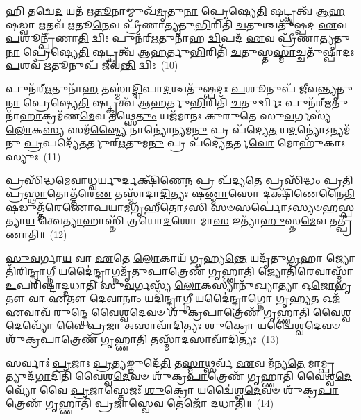 𑌹𑌿 𑌤𑌦𑍍𑌵𑍇\-\ul{𑌦} 𑌯𑌤᳴ 𑌋\-\ul{𑌤𑍂}\-𑌨𑌾𑌮𑍍𑌮𑍁𑌖᳴\-\ul{𑌮𑍃}\-𑌤𑍁\-\ul{𑌨𑌾} 𑌪𑍍𑌰𑍇𑌷𑍍𑌯𑍇\-\ul{𑌤𑌿} 𑌷𑌟𑍍𑌕𑍃𑌤𑍍𑌵᳴ 𑌆\-\ul{𑌹} 𑌷𑌡𑍍𑌵𑌾 \ul{𑌋}\-𑌤𑌵᳴ \ul{𑌋}\-𑌤𑍂\-\ul{𑌨𑍇}\-𑌵 𑌪𑍍𑌰𑍀᳴𑌣𑌾\-\ul{𑌤𑍍𑌯𑍃}\-𑌤𑍁\-\ul{𑌭𑌿}\-𑌰𑌿𑌤𑌿᳴ \ul{𑌚}\-𑌤𑍁𑌶𑍍𑌚𑌤𑍁᳴𑌷𑍍𑌪𑌦 \ul{𑌏}\-𑌵 \ul{𑌪}\-𑌶𑍂𑌨𑍍𑌪𑍍𑌰𑍀᳴𑌣𑌾\-\ul{𑌤𑌿} 𑌦𑍍𑌵𑌿𑌃 𑌪𑍁𑌨᳴𑌰𑍍\mbox{}\-\ul{𑌋}\-𑌤𑍁𑌨𑌾᳴𑌹 \ul{𑌦𑍍𑌵𑌿}\-𑌪𑌦᳴ \ul{𑌏}\-𑌵 𑌪𑍍𑌰𑍀᳴𑌣𑌾\-\ul{𑌤𑍍𑌯𑍃}\-𑌤𑍁\-\ul{𑌨𑌾} 𑌪𑍍𑌰𑍇𑌷𑍍𑌯𑍇\-\ul{𑌤𑌿} 𑌷𑌟𑍍𑌕𑍃𑌤𑍍𑌵᳴ 𑌆\-\ul{𑌹}\-𑌰𑍍𑌤𑍁\-\ul{𑌭𑌿}\-𑌰𑌿𑌤𑌿᳴ \ul{𑌚}\-𑌤𑍁𑌸𑍍𑌤\-\ul{𑌸𑍍𑌮𑌾}\-𑌚𑍍𑌚𑌤𑍁᳴𑌷𑍍𑌪𑌾𑌦𑌃 \ul{𑌪}\-𑌶𑌵᳴ \ul{𑌋}\-𑌤𑍂𑌨𑍁𑌪᳴ 𑌜𑍀𑌵\-\ul{𑌨𑍍𑌤𑌿} 𑌦𑍍𑌵𑌿𑌃~(10)

𑌪𑍁𑌨᳴𑌰𑍍\mbox{}\-\ul{𑌋}\-𑌤𑍁𑌨𑌾᳴\-\ul{𑌹} 𑌤𑌸𑍍𑌮𑌾॑\-\ul{𑌦𑍍𑌦𑍍𑌵𑌿}\-𑌪𑌾\-\ul{𑌦}\-𑌶𑍍𑌚𑌤𑍁᳴𑌷𑍍𑌪𑌦𑌃 \ul{𑌪}\-𑌶𑍂𑌨𑍁𑌪᳴ 𑌜𑍀𑌵\-\ul{𑌨𑍍𑌤𑍍𑌯𑍃}\-𑌤𑍁\-\ul{𑌨𑌾} 𑌪𑍍𑌰𑍇𑌷𑍍𑌯𑍇\-\ul{𑌤𑌿} 𑌷𑌟𑍍𑌕𑍃𑌤𑍍𑌵᳴ 𑌆\-\ul{𑌹}\-𑌰𑍍𑌤𑍁\-\ul{𑌭𑌿}\-𑌰𑌿𑌤𑌿᳴ \ul{𑌚}\-𑌤𑍁𑌰𑍍𑌦𑍍𑌵𑌿𑌃 𑌪𑍁𑌨᳴𑌰𑍍\mbox{}\-\ul{𑌋}\-𑌤𑍁𑌨𑌾᳴\-\ul{𑌹𑌾}\-𑌕𑍍𑌰𑌮᳴𑌣\-\ul{𑌮𑍇}\-𑌵 𑌤𑌥𑍍𑌸𑍇\-\ul{𑌤𑍁𑌂} 𑌯𑌜᳴𑌮𑌾𑌨𑌃 𑌕𑍁𑌰𑍁𑌤𑍇 𑌸𑍁\-\ul{𑌵}\-𑌰𑍍𑌗𑌸𑍍𑌯᳴ \ul{𑌲𑍋}\-𑌕\-\ul{𑌸𑍍𑌯} 𑌸𑌮᳴\-\ul{𑌷𑍍𑌟𑍍𑌯𑍈} 𑌨𑌾𑌨𑍍𑌯𑍋॑𑌨𑍍𑌯𑌮\-\ul{𑌨𑍁} 𑌪𑍍𑌰 𑌪᳴𑌦𑍍𑌯𑍇\-\ul{𑌤} 𑌯\-\ul{𑌦}\-𑌨𑍍𑌯𑍋॑\-𑌽𑌨𑍍𑌯𑌮᳴𑌨𑍁 \ul{𑌪𑍍𑌰}\-𑌪𑌦𑍍𑌯𑍇᳴\-\ul{𑌤}\-𑌰𑍍𑌤𑍁𑌰𑍍\mbox{}\-\ul{𑌋}\-𑌤𑍁𑌮\-\ul{𑌨𑍁} 𑌪𑍍𑌰 𑌪᳴𑌦𑍍𑌯𑍇\-\ul{𑌤}\-𑌰𑍍𑌤\-\ul{𑌵𑍋} 𑌮𑍋𑌹𑍁᳴𑌕𑌾𑌃 𑌸𑍍𑌯𑍁𑌃~(11)

𑌪𑍍𑌰𑌸𑌿᳴𑌦𑍍𑌧\-\ul{𑌮𑍇}\-𑌵𑌾\-\ul{𑌧𑍍𑌵}\-𑌰𑍍𑌯𑍁𑌰𑍍𑌦𑌕𑍍𑌷𑌿᳴𑌣𑍇\-\ul{𑌨} 𑌪𑍍𑌰 𑌪᳴𑌦𑍍𑌯\-\ul{𑌤𑍇} 𑌪𑍍𑌰𑌸𑌿᳴𑌦𑍍𑌧𑌂 𑌪𑍍𑌰𑌤𑌿𑌪𑍍𑌰\-\ul{𑌸𑍍𑌥𑌾}\-𑌤𑍋𑌤𑍍𑌤᳴𑌰𑍇\-\ul{𑌣} 𑌤𑌸𑍍𑌮𑌾᳴𑌦𑌾\-\ul{𑌦𑌿}\-𑌤𑍍𑌯𑌃 𑌷\-\ul{𑌣𑍍𑌮𑌾}\-𑌸𑍋 𑌦𑌕𑍍𑌷𑌿᳴𑌣𑍇𑌨𑍈\-\ul{𑌤𑌿} 𑌷𑌡𑍁𑌤𑍍𑌤᳴𑌰𑍇𑌣𑍋𑌪\-\ul{𑌯𑌾}\-𑌮𑌗𑍃᳴𑌹𑍀𑌤𑍋\-𑌽𑌸𑌿 \ul{𑌸}\-\-\ul{𑍞}\-𑌸𑌰𑍍𑌪𑍋॑\-𑌽𑌸𑍍𑌯𑍞𑌹\-\ul{𑌸𑍍𑌪}\-𑌤𑍍𑌯𑌾\-\ul{𑌯} 𑌤𑍍𑌵𑍇\-\ul{𑌤𑍍𑌯𑌾}\-𑌹𑌾𑌸𑍍𑌤𑌿᳴ 𑌤𑍍𑌰𑌯𑍋\-\ul{𑌦}\-𑌶𑍋 𑌮𑌾\-\ul{𑌸} 𑌇𑌤𑍍𑌯𑌾᳴\-\ul{𑌹𑍁}\-𑌸𑍍𑌤\-\ul{𑌮𑍇}\-𑌵 𑌤𑌤𑍍𑌪𑍍𑌰𑍀᳴𑌣𑌾𑌤𑌿॥~(12)

{\anuvakamend[{𑌕𑍋 𑌜𑍀᳴𑌵\-\ul{𑌨𑍍𑌤𑌿} 𑌦𑍍𑌵𑌿𑌃 \ul{𑌸𑍍𑌯𑍁}\-𑌶𑍍𑌚𑌤𑍁᳴𑌸𑍍𑌤𑍍𑌰𑌿𑍞𑌶𑌚𑍍𑌚}]}%

\-\ul{𑌸𑍁}\-\-\ul{𑌵}\-𑌰𑍍𑌗𑌾\-\ul{𑌯} 𑌵𑌾 \ul{𑌏}\-𑌤𑍇 \ul{𑌲𑍋}\-𑌕𑌾𑌯᳴ 𑌗𑍃𑌹𑍍𑌯\-\ul{𑌨𑍍𑌤𑍇} 𑌯𑌦𑍃᳴𑌤𑍁\-\ul{𑌗𑍍𑌰}\-𑌹𑌾 𑌜𑍍𑌯𑍋𑌤𑌿᳴𑌰𑌿\-\ul{𑌨𑍍𑌦𑍍𑌰𑌾}\-𑌗𑍍𑌨𑍀 𑌯𑌦𑍈॑\-\ul{𑌨𑍍𑌦𑍍𑌰𑌾}\-𑌗𑍍𑌨𑌮𑍃᳴𑌤𑍁\-\ul{𑌪𑌾}\-𑌤𑍍𑌰𑍇𑌣᳴ \ul{𑌗𑍃}\-𑌹𑍍𑌣𑌾\-\ul{𑌤𑌿} 𑌜𑍍𑌯𑍋𑌤𑌿᳴\-\ul{𑌰𑍇}\-𑌵𑌾𑌸𑍍𑌮𑌾᳴ \ul{𑌉}\-𑌪𑌰𑌿᳴𑌷𑍍𑌟𑌾𑌦𑍍𑌦𑌧𑌾𑌤𑌿 𑌸𑍁\-\ul{𑌵}\-𑌰𑍍𑌗𑌸𑍍𑌯᳴ \ul{𑌲𑍋}\-𑌕𑌸𑍍𑌯𑌾𑌨𑍁᳴𑌖𑍍𑌯𑌾𑌤𑍍𑌯𑌾 𑌓\-\ul{𑌜𑍋}\-𑌭𑍃\-\ul{𑌤𑍗} 𑌵𑌾 \ul{𑌏}\-𑌤𑍗 \ul{𑌦𑍇}\-𑌵𑌾\-\ul{𑌨𑌾𑌂} 𑌯𑌦𑌿᳴\-\ul{𑌨𑍍𑌦𑍍𑌰𑌾}\-𑌗𑍍𑌨𑍀 𑌯𑌦𑍈॑\-\ul{𑌨𑍍𑌦𑍍𑌰𑌾}\-𑌗𑍍𑌨𑍋 \ul{𑌗𑍃}\-𑌹𑍍𑌯\-\ul{𑌤} 𑌓𑌜᳴ \ul{𑌏}\-𑌵𑌾𑌵᳴ 𑌰𑍁𑌨𑍍𑌦𑍍𑌧𑍇 𑌵𑍈𑌶𑍍𑌵\-\ul{𑌦𑍇}\-𑌵𑍞 𑌶𑍁᳴𑌕𑍍𑌰\-\ul{𑌪𑌾}\-𑌤𑍍𑌰𑍇𑌣᳴ 𑌗𑍃𑌹𑍍𑌣𑌾𑌤𑌿 𑌵𑍈𑌶𑍍𑌵\-\ul{𑌦𑍇}\-𑌵𑍍𑌯𑍋᳴ 𑌵𑍈 \ul{𑌪𑍍𑌰}\-𑌜𑌾 \ul{𑌅}\-𑌸𑌾𑌵𑌾᳴\-\ul{𑌦𑌿}\-𑌤𑍍𑌯𑌃 \ul{𑌶𑍁}\-𑌕𑍍𑌰𑍋 𑌯𑌦𑍍𑌵𑍈॑𑌶𑍍𑌵\-\ul{𑌦𑍇}\-𑌵𑍞 𑌶𑍁᳴𑌕𑍍𑌰\-\ul{𑌪𑌾}\-𑌤𑍍𑌰𑍇𑌣᳴ \ul{𑌗𑍃}\-𑌹𑍍𑌣𑌾\-\ul{𑌤𑌿} 𑌤𑌸𑍍𑌮𑌾᳴\-\ul{𑌦}\-𑌸𑌾𑌵𑌾᳴\-\ul{𑌦𑌿}\-𑌤𑍍𑌯𑌃~(13)

𑌸𑌰𑍍𑌵𑌾𑌃॑ \ul{𑌪𑍍𑌰}\-𑌜𑌾𑌃 \ul{𑌪𑍍𑌰}\-𑌤𑍍𑌯𑌙𑍍𑌙𑍁𑌦𑍇᳴\-\ul{𑌤𑌿} 𑌤\-\ul{𑌸𑍍𑌮𑌾}\-𑌥𑍍𑌸𑌰𑍍𑌵᳴ \ul{𑌏}\-𑌵 𑌮᳴𑌨𑍍𑌯\-\ul{𑌤𑍇} 𑌮𑌾𑌮𑍍𑌪𑍍𑌰𑌤𑍍𑌯𑍁𑌦᳴\-\ul{𑌗𑌾}\-𑌦𑌿𑌤𑌿᳴ 𑌵𑍈𑌶𑍍𑌵\-\ul{𑌦𑍇}\-𑌵𑍞 𑌶𑍁᳴𑌕𑍍𑌰\-\ul{𑌪𑌾}\-𑌤𑍍𑌰𑍇𑌣᳴ 𑌗𑍃𑌹𑍍𑌣𑌾𑌤𑌿 𑌵𑍈𑌶𑍍𑌵\-\ul{𑌦𑍇}\-𑌵𑍍𑌯𑍋᳴ 𑌵𑍈 \ul{𑌪𑍍𑌰}\-𑌜𑌾𑌸𑍍𑌤𑍇𑌜𑌃᳴ \ul{𑌶𑍁}\-𑌕𑍍𑌰𑍋 𑌯𑌦𑍍𑌵𑍈॑𑌶𑍍𑌵\-\ul{𑌦𑍇}\-𑌵𑍞 𑌶𑍁᳴𑌕𑍍𑌰\-\ul{𑌪𑌾}\-𑌤𑍍𑌰𑍇𑌣᳴ \ul{𑌗𑍃}\-𑌹𑍍𑌣𑌾𑌤𑌿᳴ \ul{𑌪𑍍𑌰}\-𑌜𑌾\-\ul{𑌸𑍍𑌵𑍇}\-𑌵 𑌤𑍇𑌜𑍋᳴ 𑌦𑌧𑌾𑌤𑌿॥~(14)

